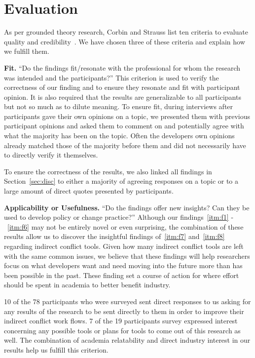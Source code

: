 \documentclass[conference]{IEEEtran}
\begin{document}
\section{Evaluation}
\label{sec:eval}

As per grounded theory research, Corbin and Strauss list ten criteria to evaluate quality and credibility~\cite{Corbin:1998:SP}.
We have chosen three of these criteria and explain how we fulfill them.

{\bfseries Fit.} ``Do the findings fit/resonate with the professional for whom the research was intended and the participants?'' This
criterion is used to verify the correctness of our finding and to ensure they resonate and fit with participant opinion. It is also
required that the results are generalizable to all participants but not so much as to dilute meaning. To ensure fit, during interviews
after participants gave their own opinions on a topic, we presented them with previous participant opinions and asked them to comment
on and potentially agree with what the majority has been on the topic. Often the developers own opinions already matched those of
the majority before them and did not necessarily have to directly verify it themselves.

To ensure the correctness of the results, we also linked all findings in Section~\ref{sec:disc} to either a majority of agreeing
responses on a topic or to a large amount of direct quotes presented by participants.

{\bfseries Applicability or Usefulness.} ``Do the findings offer new insights? Can they be used to develop policy or change practice?''
Although our findings~\ref{itm:f1} -~\ref{itm:f6} may not be entirely novel or even surprising, the combination of these results allow us to discover the
insightful findings of~\ref{itm:f7} and~\ref{itm:f8} regarding indirect conflict tools. Given how many indirect conflict tools are left with the same common
issues, we believe that these findings will help researchers focus on what developers want and need moving into the future more than has
been possible in the past. These finding set a course of action for where effort should be spent in academia to better benefit industry.

10 of the 78 participants who were surveyed sent direct responses to us asking for any results of the research to be sent directly to
them in order to improve their indirect conflict work flows. 7 of the 19 participants survey expressed interest concerning any possible
tools or plans for tools to come out of this research as well. The combination of academia relatability and direct industry interest 
in our results help us fulfill this criterion.
\end{document}
